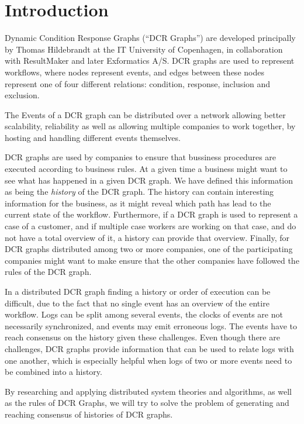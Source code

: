 \chapter{Introduction}
	Dynamic Condition Response Graphs (“DCR Graphs”) are developed principally by Thomas Hildebrandt at the IT University of Copenhagen, in collaboration with ResultMaker and later Exformatics A/S. DCR graphs are used to represent workflows, where nodes represent events, and edges between these nodes represent one of four different relations: condition, response, inclusion and exclusion. 
	
	\newpar The Events of a DCR graph can be distributed over a network allowing better scalability, reliability as well as allowing multiple companies to work together, by hosting and handling different events themselves. 
	
	\newpar DCR graphs are used by companies to ensure that bussiness procedures are executed according to business rules. At a given time a business might want to see what has happened in a given DCR graph. We have defined this information as being the \textit{history} of the DCR graph. The history can contain interesting information for the business, as it might reveal which path has lead to the current state of the workflow. Furthermore, if a DCR graph is used to represent a case of a customer, and if multiple case workers are working on that case, and do not have a total overview of it, a history can provide that overview. Finally, for DCR graphs distributed among two or more companies, one of the participating companies might want to make ensure that the other companies have followed the rules of the DCR graph.
	
	\newpar In a distributed DCR graph finding a history or order of execution can be difficult, due to the fact that no single event has an overview of the entire workflow. Logs can be split among several events, the clocks of events are not necessarily synchronized, and events may emit erroneous logs. The events have to reach consensus on the history given these challenges. Even though there are challenges, DCR graphs provide information that can be used to relate logs with one another, which is especially helpful when logs of two or more events need to be combined into a history.
	
	\newpar By researching and applying distributed system theories and algorithms, as well as the rules of DCR Graphs, we will try to solve the problem of generating and reaching consensus of histories of DCR graphs. 